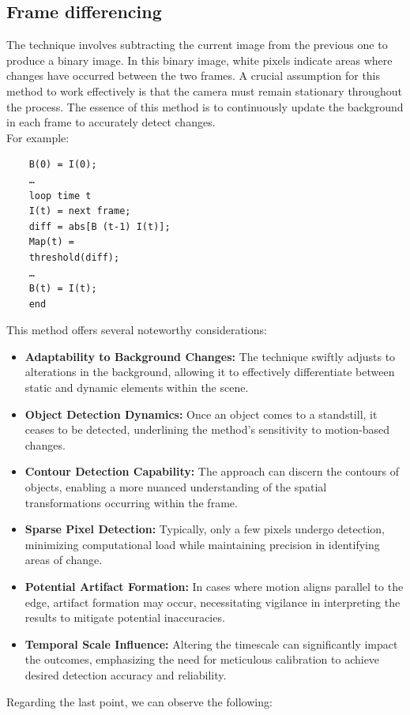 \subsection{Frame differencing}
The technique involves subtracting the current image from the previous one to produce a binary image. 
In this binary image, white pixels indicate areas where changes have occurred between the two frames. 
A crucial assumption for this method to work effectively is that the camera must remain stationary throughout the process. 
The essence of this method is to continuously update the background in each frame to accurately detect changes.
\\For example:
\begin{verbatim}
    B(0) = I(0);
    …
    loop time t
    I(t) = next frame;
    diff = abs[B (t-1) I(t)];
    Map(t) =
    threshold(diff);
    …
    B(t) = I(t);
    end
\end{verbatim} 
This method offers several noteworthy considerations:
\begin{itemize}
    \item \textbf{Adaptability to Background Changes:} The technique swiftly adjusts to alterations in the background, allowing it to effectively differentiate between static and dynamic elements within the scene.
    \item \textbf{Object Detection Dynamics:} Once an object comes to a standstill, it ceases to be detected, underlining the method's sensitivity to motion-based changes.
    \item \textbf{Contour Detection Capability:} The approach can discern the contours of objects, enabling a more nuanced understanding of the spatial transformations occurring within the frame.
    \item \textbf{Sparse Pixel Detection:} Typically, only a few pixels undergo detection, minimizing computational load while maintaining precision in identifying areas of change.
    \item \textbf{Potential Artifact Formation:} In cases where motion aligns parallel to the edge, artifact formation may occur, necessitating vigilance in interpreting the results to mitigate potential inaccuracies.
    \item \textbf{Temporal Scale Influence:} Altering the timescale can significantly impact the outcomes, emphasizing the need for meticulous calibration to achieve desired detection accuracy and reliability.
\end{itemize}
Regarding the last point, we can observe the following:
